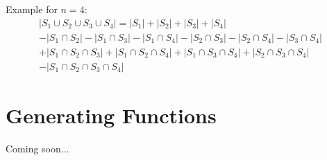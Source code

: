 \documentclass[12pt]{article}
\begin{document}
Example for $n=4:$
\newcommand{\dlist}[1]{S_{#1}}
\begin{multline*}
    |\dlist{1} \cup \dlist{2} \cup \dlist{3} \cup \dlist{4}| = |\dlist{1}| + |\dlist{2}| + |\dlist{3}| + |\dlist{4}|\\ 
    -|\dlist{1} \cap \dlist{2}| - |\dlist{1} \cap \dlist{3}| - |\dlist{1} \cap \dlist{4}| - |\dlist{2} \cap \dlist{3}| - |\dlist{2} \cap \dlist{4}| - |\dlist{3} \cap \dlist{4}|\\
    +|\dlist{1} \cap \dlist{2} \cap \dlist{3}| + |\dlist{1} \cap \dlist{2} \cap \dlist{4}| + |\dlist{1} \cap \dlist{3} \cap \dlist{4}| + |\dlist{2} \cap \dlist{3} \cap \dlist{4}|\\
    -|\dlist{1} \cap \dlist{2} \cap \dlist{3} \cap \dlist{4}|
\end{multline*}


\section*{Generating Functions}
Coming soon...
\end{document}
